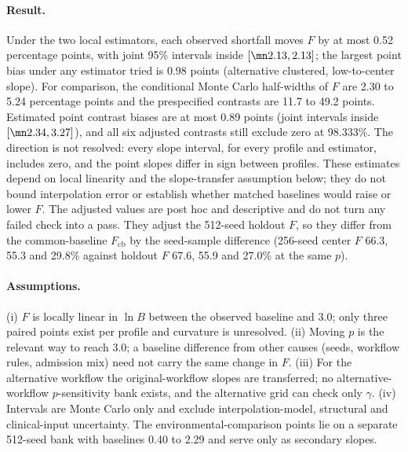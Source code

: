 \paragraph{Result.} Under the two local estimators, each observed shortfall moves
$F$ by at most 0.52 percentage points, with joint 95\% intervals inside
$[\mn2.13, 2.13]$; the largest point bias under any estimator tried is 0.98
points (alternative clustered, low-to-center slope). For comparison, the
conditional Monte Carlo half-widths of $F$ are 2.30 to 5.24 percentage points and
the prespecified contrasts are 11.7 to 49.2 points. Estimated point contrast biases are at most
0.89 points (joint intervals inside $[\mn2.34, 3.27]$), and all six adjusted
contrasts still exclude zero at 98.333\%. The direction is not resolved: every
slope interval, for every profile and estimator, includes zero, and the point
slopes differ in sign between profiles. These estimates depend on local
linearity and the slope-transfer assumption below; they do not bound
interpolation error or establish whether matched baselines would raise or lower $F$.
The adjusted values are post hoc and descriptive and do not turn any failed check
into a pass. They adjust the 512-seed holdout $F$, so they differ from the
common-baseline $F_{\mathrm{cb}}$ by the seed-sample difference (256-seed center $F$ 66.3,
55.3 and 29.8\% against holdout $F$ 67.6, 55.9 and 27.0\% at the same $p$).

\paragraph{Assumptions.} (i) $F$ is locally linear in $\ln B$ between the
observed baseline and 3.0; only three paired points exist per profile and
curvature is unresolved. (ii) Moving $p$ is the relevant way to reach 3.0; a
baseline difference from other causes (seeds, workflow rules, admission mix)
need not carry the same change in $F$. (iii) For the alternative workflow the
original-workflow slopes are transferred; no alternative-workflow
$p$-sensitivity bank exists, and the alternative grid can check only $\gamma$.
(iv) Intervals are Monte Carlo only and exclude interpolation-model, structural
and clinical-input uncertainty. The environmental-comparison points lie on a
separate 512-seed bank with baselines 0.40 to 2.29 and serve only as secondary
slopes.

